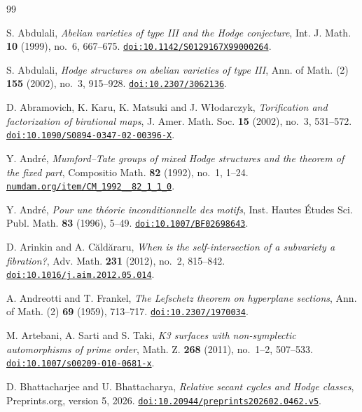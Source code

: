 \begin{thebibliography}{99}\raggedright

S. Abdulali,
\emph{Abelian varieties of type III and the Hodge conjecture},
Int. J. Math. \textbf{10} (1999), no.~6, 667--675.
\href{https://doi.org/10.1142/S0129167X99000264}{\nolinkurl{doi:10.1142/S0129167X99000264}}.

S. Abdulali,
\emph{Hodge structures on abelian varieties of type III},
Ann. of Math. (2) \textbf{155} (2002), no.~3, 915--928.
\href{https://doi.org/10.2307/3062136}{\nolinkurl{doi:10.2307/3062136}}.

D. Abramovich, K. Karu, K. Matsuki and J. W\l{}odarczyk,
\emph{Torification and factorization of birational maps},
J. Amer. Math. Soc. \textbf{15} (2002), no.~3, 531--572.
\href{https://doi.org/10.1090/S0894-0347-02-00396-X}{\nolinkurl{doi:10.1090/S0894-0347-02-00396-X}}.

Y. Andr\'e,
\emph{Mumford--Tate groups of mixed Hodge structures and the theorem of the
fixed part},
Compositio Math. \textbf{82} (1992), no.~1, 1--24.
\href{http://www.numdam.org/item/CM_1992__82_1_1_0/}{\nolinkurl{numdam.org/item/CM_1992__82_1_1_0}}.

Y. Andr\'e,
\emph{Pour une th\'eorie inconditionnelle des motifs},
Inst. Hautes \'Etudes Sci. Publ. Math. \textbf{83} (1996), 5--49.
\href{https://doi.org/10.1007/BF02698643}{\nolinkurl{doi:10.1007/BF02698643}}.

D. Arinkin and A. C\u{a}ld\u{a}raru,
\emph{When is the self-intersection of a subvariety a fibration?},
Adv. Math. \textbf{231} (2012), no.~2, 815--842.
\href{https://doi.org/10.1016/j.aim.2012.05.014}{\nolinkurl{doi:10.1016/j.aim.2012.05.014}}.

A. Andreotti and T. Frankel,
\emph{The Lefschetz theorem on hyperplane sections},
Ann. of Math. (2) \textbf{69} (1959), 713--717.
\href{https://doi.org/10.2307/1970034}{\nolinkurl{doi:10.2307/1970034}}.

M. Artebani, A. Sarti and S. Taki,
\emph{K3 surfaces with non-symplectic automorphisms of prime order},
Math. Z. \textbf{268} (2011), no.~1--2, 507--533.
\href{https://doi.org/10.1007/s00209-010-0681-x}{\nolinkurl{doi:10.1007/s00209-010-0681-x}}.

D. Bhattacharjee and U. Bhattacharya,
\emph{Relative secant cycles and Hodge classes},
Preprints.org, version 5, 2026.
\href{https://doi.org/10.20944/preprints202602.0462.v5}{\nolinkurl{doi:10.20944/preprints202602.0462.v5}}.


\end{thebibliography}
